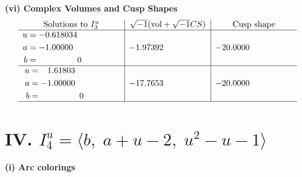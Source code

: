 \documentclass[1p]{elsarticle_modified}
\theoremstyle{definition}
\newcommand{\I}{\sqrt{-1}}
\begin{document}
\newpage\flushleft \textbf{(vi) Complex Volumes and Cusp Shapes}
$$\begin{array}{c|c|c}  
\text{Solutions to }I^u_{3}& \I (\text{vol} + \sqrt{-1}CS) & \text{Cusp shape}\\
 \hline 
\begin{aligned}
u &= -0.618034\phantom{ +0.000000I} \\
a &= -1.00000\phantom{ +0.000000I} \\
b &= \phantom{-0.000000 } 0\end{aligned}
 & -1.97392\phantom{ +0.000000I} & -20.0000\phantom{ +0.000000I} \\ \hline\begin{aligned}
u &= \phantom{-}1.61803\phantom{ +0.000000I} \\
a &= -1.00000\phantom{ +0.000000I} \\
b &= \phantom{-0.000000 } 0\end{aligned}
 & -17.7653\phantom{ +0.000000I} & -20.0000\phantom{ +0.000000I}\\
 \hline 
 \end{array}$$\newpage\newpage\renewcommand{\arraystretch}{1}
\centering \section*{IV. $I^u_{4}= \langle b,\;a+u-2,\;u^2- u-1 \rangle$}
\flushleft \textbf{(i) Arc colorings}\\
\end{document}
